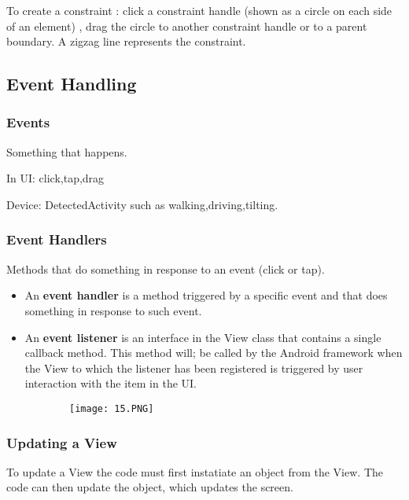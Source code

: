 \documentclass{article}
\begin{document}
  To create a constraint : click a constraint handle (shown as a circle on each side of an element) , drag the circle to another constraint handle or to a parent boundary. A zigzag line represents the constraint.

  \subsection{Event Handling}

\subsubsection{Events}

Something that happens.

In UI: click,tap,drag

Device: DetectedActivity such as walking,driving,tilting.

\subsubsection{Event Handlers}

Methods that do something in response to an event (click or tap).

\begin{itemize}
    \item An \textbf{event handler} is a method triggered by a specific event and that does something in response to such event.
    \item An \textbf{event listener} is an interface in the View class that contains a single callback method. This method will; be called by the Android framework when the View to which the listener has been registered is triggered by user interaction with the item in the UI.
\end{itemize}

    \begin{figure}[ht!]
  \centering
  \begin{subfigure}[b]{0.8\linewidth}
    \texttt{[image: 15.PNG]}
  \end{subfigure}
  \end{figure}

  \subsubsection{Updating a View}

  To update a View the code must first instatiate an object from the View. The code can then update the object, which updates the screen.
  
\end{document}
